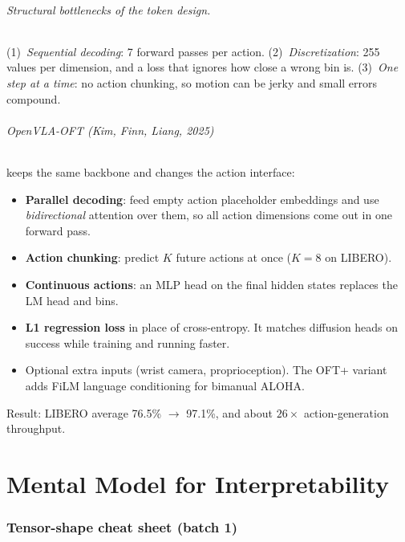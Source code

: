 \documentclass[11pt]{article}
\begin{document}
\paragraph{Structural bottlenecks of the token design.}
(1)~\emph{Sequential decoding}: 7 forward passes per action. (2)~\emph{Discretization}: 255 values per dimension, and a loss that ignores how close a wrong bin is. (3)~\emph{One step at a time}: no action chunking, so motion can be jerky and small errors compound.

\paragraph{OpenVLA-OFT (Kim, Finn, Liang, 2025)} \cite{kim2025oft} keeps the same backbone and changes the action interface:
\begin{itemize}
  \item \textbf{Parallel decoding}: feed empty action placeholder embeddings and use \emph{bidirectional} attention over them, so all action dimensions come out in one forward pass.
  \item \textbf{Action chunking}: predict $K$ future actions at once ($K=8$ on LIBERO).
  \item \textbf{Continuous actions}: an MLP head on the final hidden states replaces the LM head and bins.
  \item \textbf{L1 regression loss} in place of cross-entropy. It matches diffusion heads on success while training and running faster.
  \item Optional extra inputs (wrist camera, proprioception). The OFT+ variant adds FiLM language conditioning for bimanual ALOHA.
\end{itemize}
Result: LIBERO average 76.5\% $\to$ 97.1\%, and about $26\times$ action-generation throughput.

\part{Mental Model for Interpretability}

\section{Tensor-shape cheat sheet (batch 1)}
\end{document}
